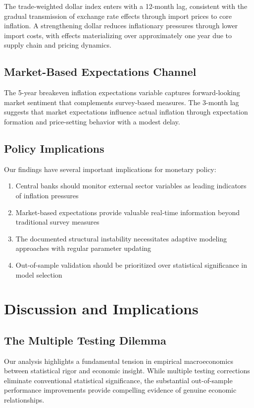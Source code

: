 \documentclass[12pt]{article}
\begin{document}
The trade-weighted dollar index enters with a 12-month lag, consistent with the gradual transmission of exchange rate effects through import prices to core inflation. A strengthening dollar reduces inflationary pressures through lower import costs, with effects materializing over approximately one year due to supply chain and pricing dynamics.

\subsection{Market-Based Expectations Channel}

The 5-year breakeven inflation expectations variable captures forward-looking market sentiment that complements survey-based measures. The 3-month lag suggests that market expectations influence actual inflation through expectation formation and price-setting behavior with a modest delay.

\subsection{Policy Implications}

Our findings have several important implications for monetary policy:

\begin{enumerate}
\item Central banks should monitor external sector variables as leading indicators of inflation pressures
\item Market-based expectations provide valuable real-time information beyond traditional survey measures
\item The documented structural instability necessitates adaptive modeling approaches with regular parameter updating
\item Out-of-sample validation should be prioritized over statistical significance in model selection
\end{enumerate}

\section{Discussion and Implications}

\subsection{The Multiple Testing Dilemma}

Our analysis highlights a fundamental tension in empirical macroeconomics between statistical rigor and economic insight. While multiple testing corrections eliminate conventional statistical significance, the substantial out-of-sample performance improvements provide compelling evidence of genuine economic relationships.
\end{document}
